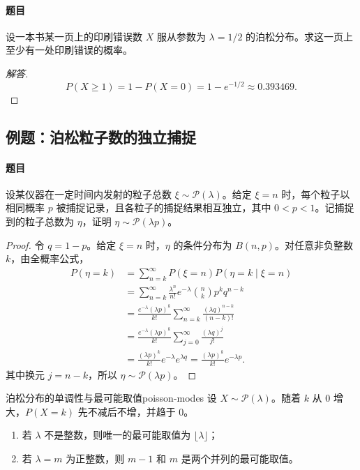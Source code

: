 \paragraph{题目}
设一本书某一页上的印刷错误数 $X$ 服从参数为 $\lambda=1/2$ 的泊松分布。求这一页上至少有一处印刷错误的概率。

\begin{proof}[解答]
\[
P(X\geq1)=1-P(X=0)=1-e^{-1/2}\approx0.393469.
\]
\end{proof}

\subsection{例题：泊松粒子数的独立捕捉}\label{note:c2:e7}
\paragraph{题目}
设某仪器在一定时间内发射的粒子总数 $\xi\sim\mathcal P(\lambda)$。给定 $\xi=n$ 时，每个粒子以相同概率 $p$ 被捕捉记录，且各粒子的捕捉结果相互独立，其中 $0<p<1$。记捕捉到的粒子总数为 $\eta$，证明 $\eta\sim\mathcal P(\lambda p)$。

\begin{proof}
令 $q=1-p$。给定 $\xi=n$ 时，$\eta$ 的条件分布为 $B(n,p)$。对任意非负整数 $k$，由全概率公式，
\[
\begin{aligned}
P(\eta=k)
&=\sum_{n=k}^{\infty}P(\xi=n)P(\eta=k\mid\xi=n)\\
&=\sum_{n=k}^{\infty}\frac{\lambda^n}{n!}e^{-\lambda}
\binom nk p^kq^{n-k}\\
&=\frac{e^{-\lambda}(\lambda p)^k}{k!}
\sum_{n=k}^{\infty}\frac{(\lambda q)^{n-k}}{(n-k)!}\\
&=\frac{e^{-\lambda}(\lambda p)^k}{k!}
\sum_{j=0}^{\infty}\frac{(\lambda q)^j}{j!}\\
&=\frac{(\lambda p)^k}{k!}e^{-\lambda}e^{\lambda q}
=\frac{(\lambda p)^k}{k!}e^{-\lambda p}.
\end{aligned}
\]
其中换元 $j=n-k$，所以 $\eta\sim\mathcal P(\lambda p)$。
\end{proof}

\begin{proposition}{泊松分布的单调性与最可能取值}{poisson-modes}
设 $X\sim\mathcal P(\lambda)$。随着 $k$ 从 $0$ 增大，$P(X=k)$ 先不减后不增，并趋于 $0$。
\begin{enumerate}
    \item 若 $\lambda$ 不是整数，则唯一的最可能取值为 $\lfloor\lambda\rfloor$；
    \item 若 $\lambda=m$ 为正整数，则 $m-1$ 和 $m$ 是两个并列的最可能取值。
\end{enumerate}
\end{proposition}

